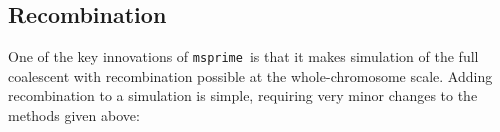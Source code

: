 \documentclass[graybox]{svmult}
\newcommand{\msprime}[0]{\texttt{msprime}}
\begin{document}






\subsection{Recombination}\label{recombination}

One of the key innovations of \msprime\ is that it makes simulation of the
full coalescent with recombination possible at the whole-chromosome scale.
Adding recombination to a simulation is simple, requiring very minor
changes to the methods given above:
\end{document}
